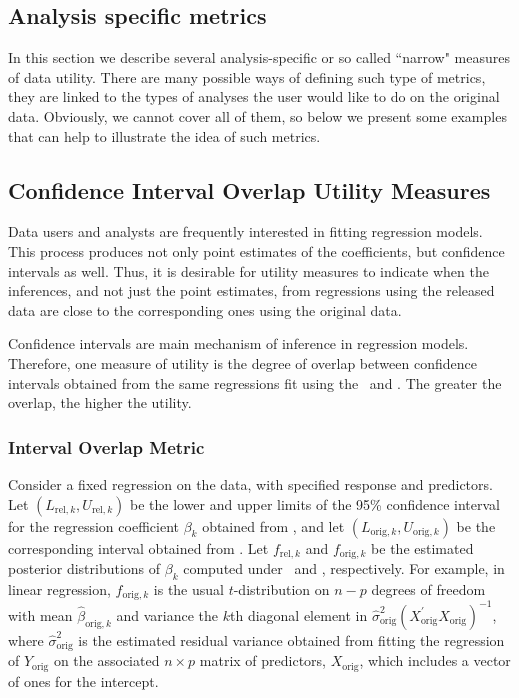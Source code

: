 \documentclass[12pt]{article}
\begin{document}
\subsection{Analysis specific metrics}
In this section we describe several analysis-specific or so called ``narrow" measures of data utility. There are many possible ways of defining such type of metrics,  they 
are linked to the types of analyses the user would like to do on the original data.
 Obviously, we cannot cover all of them, so below we present some examples 
 that can help to illustrate the idea of such metrics.



\subsection{Confidence Interval Overlap Utility Measures}\label{subsec.ci}

Data users and analysts  are frequently interested in fitting regression models. 
This process produces not only point estimates of the coefficients, but
confidence intervals as well. Thus, it is desirable for utility measures 
to indicate when the inferences, and
not just the point estimates, from regressions using the released
data are close to the corresponding ones using the original data.

Confidence intervals are main mechanism of inference in regression
models. Therefore, one measure of utility is the degree of overlap
between confidence intervals obtained from the same regressions
fit using the \DBREL\ and \DBORIG. The greater the overlap, the
higher the utility.

\subsubsection{Interval Overlap Metric}
Consider a fixed regression on the data, with specified response
and predictors. Let $(L_{\mathrm{rel},k}, U_{\mathrm{rel},k})$ be
the lower and upper limits of the 95\% confidence interval for the
regression coefficient $\beta_{k}$ obtained from \DBREL, and let
$(L_{\mathrm{orig},k}, U_{\mathrm{orig},k})$ be the corresponding
interval obtained from \DBORIG. Let $f_{\mathrm{rel},k}$ and
$f_{\mathrm{orig},k}$ be the estimated posterior distributions of
$\beta_k$ computed under \DBREL\ and \DBORIG, respectively.  For
example, in linear regression, $f_{\mathrm{orig},k}$ is the usual
$t$-distribution on $n-p$ degrees of freedom with mean
$\hat{\beta}_{\mathrm{orig},k}$ and variance the $k$th diagonal
element in
$\hat{\sigma}^2_{\mathrm{orig}}\left(X^{'}_{\mathrm{orig}}
X_{\mathrm{orig}}\right)^{-1}$, where
$\hat{\sigma}^2_{\mathrm{orig}}$ is the estimated residual
variance obtained from fitting the regression of
$Y_{\mathrm{orig}}$ on the associated $n \times p$ matrix of
predictors, $X_{\mathrm{orig}}$, which includes a vector of ones
for the intercept.
\end{document}
